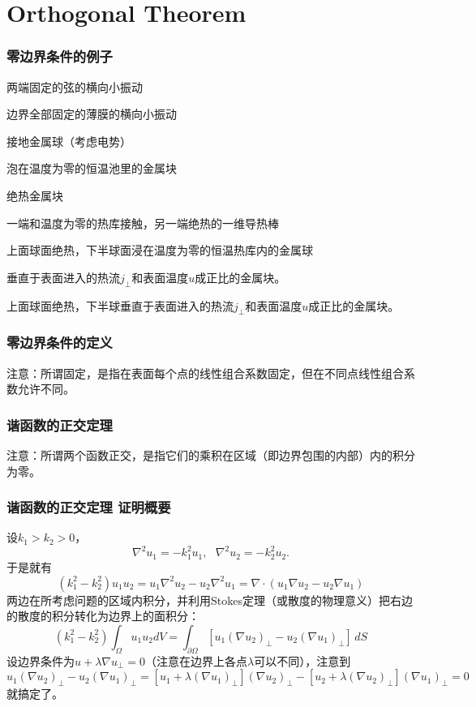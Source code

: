 \documentclass[CJK]{beamer}
\begin{document}
\section{Orthogonal Theorem}

\begin{frame}
  \frametitle{零边界条件的例子}
  \bitem
\item{两端固定的弦的横向小振动}
\item{边界全部固定的薄膜的横向小振动}
\item{接地金属球（考虑电势）}    
\item{泡在温度为零的恒温池里的金属块}
\item{绝热金属块}
\item{一端和温度为零的热库接触，另一端绝热的一维导热棒}
\item{上面球面绝热，下半球面浸在温度为零的恒温热库内的金属球}
\item{垂直于表面进入的热流$j_{\perp}$和表面温度$u$成正比的金属块。}      
\item{上面球面绝热，下半球垂直于表面进入的热流$j_{\perp}$和表面温度$u$成正比的金属块。}      
  \eitem
\end{frame}

\begin{frame}
  \frametitle{零边界条件的定义}
  注意：{\blue 所谓固定，是指在表面每个点的线性组合系数固定，但在不同点线性组合系数允许不同。}
\end{frame}

\begin{frame}
  \frametitle{谐函数的正交定理}
  
  注意：{\blue 所谓两个函数正交，是指它们的乘积在区域（即边界包围的内部）内的积分为零。}
\end{frame}

\begin{frame}
  \frametitle{谐函数的正交定理 证明概要}
{\small
  设$k_1> k_2>0$，
  $$ \nabla^2 u_1 = -k_1^2 u_1,\ \ \ \nabla^2 u_2 = -k_2^2 u_2.       $$
  于是就有
  $$(k_1^2-k_2^2)u_1u_2 = u_1\nabla^2 u_2 - u_2\nabla^2 u_1 = \nabla\cdot(u_1\nabla u_2 - u_2\nabla u_1)$$
  两边在所考虑问题的区域内积分，并利用Stokes定理（或散度的物理意义）把右边的散度的积分转化为边界上的面积分：
  $$(k_1^2-k_2^2)\int_\Omega u_1u_2 dV = \int_{\partial \Omega} \left[u_1(\nabla u_2)_{\perp} - u_2(\nabla u_1)_{\perp}\right]\, dS$$
  设边界条件为$ u + \lambda \nabla u_{\perp} = 0$（注意在边界上各点$\lambda$可以不同），注意到
  $$ u_1(\nabla u_2)_{\perp} - u_2(\nabla u_1)_{\perp} = \left[u_1+\lambda (\nabla u_1)_{\perp}\right](\nabla u_2)_{\perp} - \left[u_2+\lambda(\nabla u_2)_{\perp}\right](\nabla u_1)_{\perp} =0$$
  就搞定了。
  
  }
\end{frame}
\end{document}
